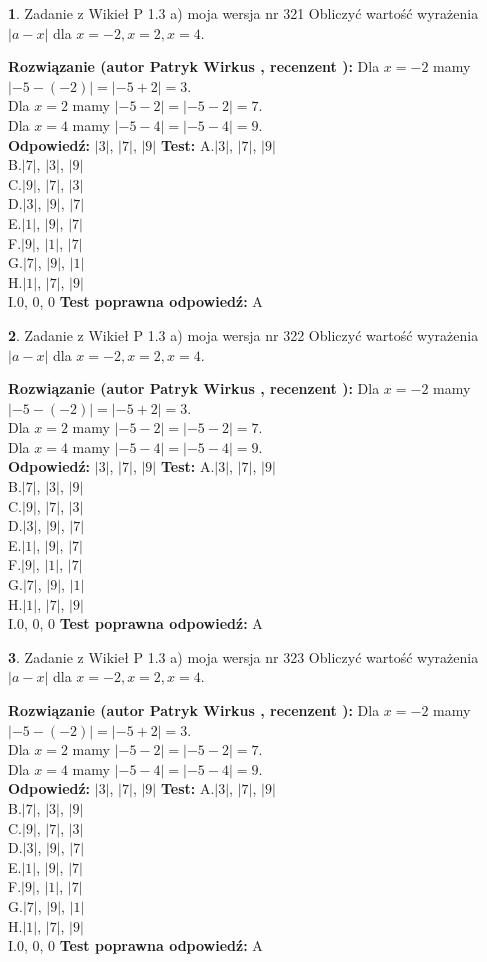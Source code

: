 \documentclass[12pt, a4paper]{article}
\theoremstyle{definition} %
\newtheorem{zad}{}
\newcommand{\zadStart}[1]{\begin{zad}#1\newline}
\newcommand{\zadStop}{\end{zad}}
\newcommand{\rozwStart}[2]{\noindent \textbf{Rozwiązanie (autor #1 , recenzent #2): }\newline}
\newcommand{\rozwStop}{\newline}
\newcommand{\odpStart}{\noindent \textbf{Odpowiedź:}\newline}
\newcommand{\odpStop}{\newline}
\newcommand{\testStart}{\noindent \textbf{Test:}\newline}
\newcommand{\testStop}{\newline}
\newcommand{\kluczStart}{\noindent \textbf{Test poprawna odpowiedź:}\newline}
\newcommand{\kluczStop}{\newline}
\begin{document}
\zadStart{Zadanie z Wikieł P 1.3 a) moja wersja nr 321}
Obliczyć wartość wyrażenia $|a - x|$ dla $x=-2,x=2,x=4$.
\zadStop
\rozwStart{Patryk Wirkus}{}
Dla $x = -2$ mamy $|-5 - (-2)| = |-5 + 2| = 3$.\\
Dla $x = 2$ mamy $|-5 - 2| = |-5 - 2| = 7$.\\
Dla $x = 4$ mamy $|-5 - 4| = |-5 - 4| = 9$.\\
\rozwStop
\odpStart
$|3|$, $|7|$, $|9|$
\odpStop
\testStart
A.$|3|$, $|7|$, $|9|$\\
B.$|7|$, $|3|$, $|9|$\\
C.$|9|$, $|7|$, $|3|$\\
D.$|3|$, $|9|$, $|7|$\\
E.$|1|$, $|9|$, $|7|$\\
F.$|9|$, $|1|$, $|7|$\\
G.$|7|$, $|9|$, $|1|$\\
H.$|1|$, $|7|$, $|9|$\\
I.$0$, $0$, $0$
\testStop
\kluczStart
A
\kluczStop



\zadStart{Zadanie z Wikieł P 1.3 a) moja wersja nr 322}
Obliczyć wartość wyrażenia $|a - x|$ dla $x=-2,x=2,x=4$.
\zadStop
\rozwStart{Patryk Wirkus}{}
Dla $x = -2$ mamy $|-5 - (-2)| = |-5 + 2| = 3$.\\
Dla $x = 2$ mamy $|-5 - 2| = |-5 - 2| = 7$.\\
Dla $x = 4$ mamy $|-5 - 4| = |-5 - 4| = 9$.\\
\rozwStop
\odpStart
$|3|$, $|7|$, $|9|$
\odpStop
\testStart
A.$|3|$, $|7|$, $|9|$\\
B.$|7|$, $|3|$, $|9|$\\
C.$|9|$, $|7|$, $|3|$\\
D.$|3|$, $|9|$, $|7|$\\
E.$|1|$, $|9|$, $|7|$\\
F.$|9|$, $|1|$, $|7|$\\
G.$|7|$, $|9|$, $|1|$\\
H.$|1|$, $|7|$, $|9|$\\
I.$0$, $0$, $0$
\testStop
\kluczStart
A
\kluczStop



\zadStart{Zadanie z Wikieł P 1.3 a) moja wersja nr 323}
Obliczyć wartość wyrażenia $|a - x|$ dla $x=-2,x=2,x=4$.
\zadStop
\rozwStart{Patryk Wirkus}{}
Dla $x = -2$ mamy $|-5 - (-2)| = |-5 + 2| = 3$.\\
Dla $x = 2$ mamy $|-5 - 2| = |-5 - 2| = 7$.\\
Dla $x = 4$ mamy $|-5 - 4| = |-5 - 4| = 9$.\\
\rozwStop
\odpStart
$|3|$, $|7|$, $|9|$
\odpStop
\testStart
A.$|3|$, $|7|$, $|9|$\\
B.$|7|$, $|3|$, $|9|$\\
C.$|9|$, $|7|$, $|3|$\\
D.$|3|$, $|9|$, $|7|$\\
E.$|1|$, $|9|$, $|7|$\\
F.$|9|$, $|1|$, $|7|$\\
G.$|7|$, $|9|$, $|1|$\\
H.$|1|$, $|7|$, $|9|$\\
I.$0$, $0$, $0$
\testStop
\kluczStart
A
\kluczStop
\end{document}
